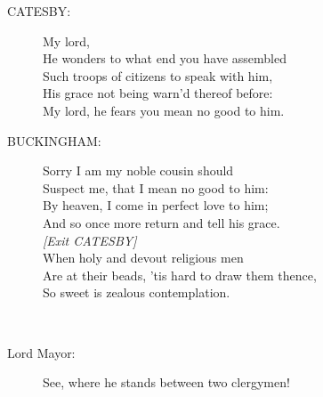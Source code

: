 \documentclass{article}
\begin{document}
\begin{description}
\item[CATESBY:] 
\hspace{1pt}My lord,\\
\hspace{1pt}He wonders to what end you have assembled\\
\hspace{1pt}Such troops of citizens to speak with him,\\
\hspace{1pt}His grace not being warn'd thereof before:\\
\hspace{1pt}My lord, he fears you mean no good to him.\\
\end{description}
\begin{description}
\item[BUCKINGHAM:] 
\hspace{1pt}Sorry I am my noble cousin should\\
\hspace{1pt}Suspect me, that I mean no good to him:\\
\hspace{1pt}By heaven, I come in perfect love to him;\\
\hspace{1pt}And so once more return and tell his grace.\\
{\it [Exit CATESBY]}\\
\hspace{1pt}When holy and devout religious men\\
\hspace{1pt}Are at their beads, 'tis hard to draw them thence,\\
\hspace{1pt}So sweet is zealous contemplation.\\
\end{description}
\\
\begin{description}
\item[Lord Mayor:] 
\hspace{1pt}See, where he stands between two clergymen!\\
\end{description}
\end{document}
